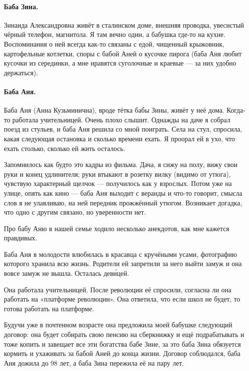 \documentclass{book}
\begin{document}
\paragraph{Баба Зина.}
Зинаида Александровна живёт в сталинском доме, внешняя проводка, увесистый чёрный телефон, магнитола.
Я там вечно один, а бабушка где-то на кухне.
Воспоминания о ней всегда как-то связаны с едой,
чищенный крыжовник, 
картофельные котлетки,
споры с бабой Аней о кусочке пирога (баба Аня любит кусочки из серединки, а мне нравятся суголочные и краевые --- за них удобно держаться).

\paragraph{Баба Аня.}
Баба Аня (Анна Кузьминична), вроде тётка бабы Зины, живёт у неё дома.
Когда-то работала учительницей.
Очень плохо слышит.
Однажды на даче я собрал поезд из стульев, и баба Аня решила со мной поиграть.
Села на стул, спросила, какая следующая остановка и сколько времени ехать.
Я проорал ей в ухо, что ехать столько, сколько ей жить осталось.

Запомнилось как будто это кадры из фильма.
Дача, я сижу на полу, вижу свои руки и конец удлинителя;
руки втыкают в розетку вилку (видимо от утюга), чувствую характерный щелчок --- получилось как у взрослых.
Потом уже на улице, опять как кино --- баба Аня выходит с веранды и что-то говорит, смысла слов я не улавливаю, на ней передник прожжённый утюгом.
Возникает догадка, что одно с другим связано, но уверенности нет.

Про бабу Аню в нашей семье ходило несколько анекдотов, как мне кажется правдивых.

Баба Аня в молодости влюбилась в красавца с кручёными усами, фотографию которого хранила всю жизнь.
Родители ей запретили за него выйти замуж и она вовсе замуж не вышла.
Осталась дев\'{и}цей.

Она работала учительницей.
После революции её спросили, согласна ли она работать на «платформе революции».
Она ответила, что если школ не будет, то готова работать на платформе.

Будучи уже в почтенном возрасте она предложила моей бабушке следующий договор: она будет собирать свою пенсию на сберкнижку и ещё подрабатывать и тоже копить и завещает все эти богатства бабе Зине, за это баба Зина обязуется кормить и ухаживать за бабой Аней до конца жизни.
Договор соблюдался, баба Аня дожила до 98 лет, а баба Зина пережила её на пару лет.
\end{document}
